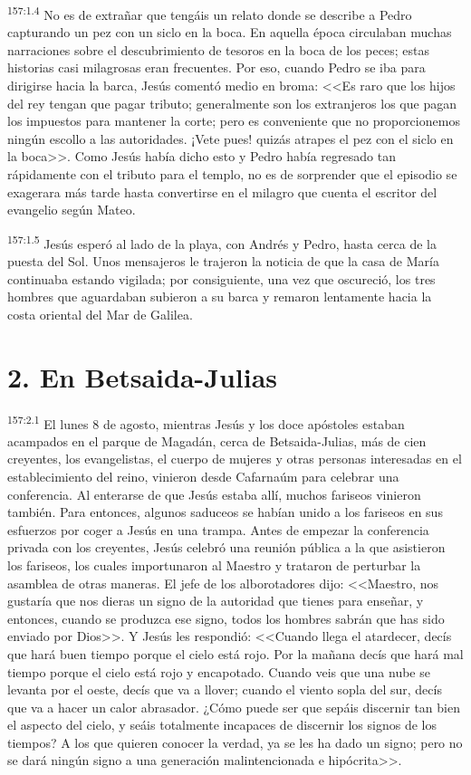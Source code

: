 \par 
\textsuperscript{157:1.4} No es de extrañar que tengáis un relato donde se describe a Pedro capturando un pez con un siclo en la boca. En aquella época circulaban muchas narraciones sobre el descubrimiento de tesoros en la boca de los peces; estas historias casi milagrosas eran frecuentes. Por eso, cuando Pedro se iba para dirigirse hacia la barca, Jesús comentó medio en broma: <<Es raro que los hijos del rey tengan que pagar tributo; generalmente son los extranjeros los que pagan los impuestos para mantener la corte; pero es conveniente que no proporcionemos ningún escollo a las autoridades. ¡Vete pues! quizás atrapes el pez con el siclo en la boca>>. Como Jesús había dicho esto y Pedro había regresado tan rápidamente con el tributo para el templo, no es de sorprender que el episodio se exagerara más tarde hasta convertirse en el milagro que cuenta el escritor del evangelio según Mateo.

\par 
\textsuperscript{157:1.5} Jesús esperó al lado de la playa, con Andrés y Pedro, hasta cerca de la puesta del Sol. Unos mensajeros le trajeron la noticia de que la casa de María continuaba estando vigilada; por consiguiente, una vez que oscureció, los tres hombres que aguardaban subieron a su barca y remaron lentamente hacia la costa oriental del Mar de Galilea.

\section*{2. En Betsaida-Julias}
\par 
\textsuperscript{157:2.1} El lunes 8 de agosto, mientras Jesús y los doce apóstoles estaban acampados en el parque de Magadán, cerca de Betsaida-Julias, más de cien creyentes, los evangelistas, el cuerpo de mujeres y otras personas interesadas en el establecimiento del reino, vinieron desde Cafarnaúm para celebrar una conferencia. Al enterarse de que Jesús estaba allí, muchos fariseos vinieron también. Para entonces, algunos saduceos se habían unido a los fariseos en sus esfuerzos por coger a Jesús en una trampa. Antes de empezar la conferencia privada con los creyentes, Jesús celebró una reunión pública a la que asistieron los fariseos, los cuales importunaron al Maestro y trataron de perturbar la asamblea de otras maneras. El jefe de los alborotadores dijo: <<Maestro, nos gustaría que nos dieras un signo de la autoridad que tienes para enseñar, y entonces, cuando se produzca ese signo, todos los hombres sabrán que has sido enviado por Dios>>. Y Jesús les respondió: <<Cuando llega el atardecer, decís que hará buen tiempo porque el cielo está rojo. Por la mañana decís que hará mal tiempo porque el cielo está rojo y encapotado. Cuando veis que una nube se levanta por el oeste, decís que va a llover; cuando el viento sopla del sur, decís que va a hacer un calor abrasador. ¿Cómo puede ser que sepáis discernir tan bien el aspecto del cielo, y seáis totalmente incapaces de discernir los signos de los tiempos? A los que quieren conocer la verdad, ya se les ha dado un signo; pero no se dará ningún signo a una generación malintencionada e hipócrita>>.

